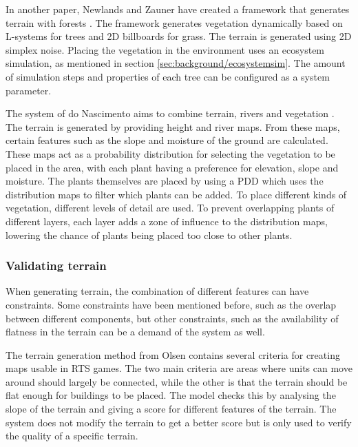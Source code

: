 \documentclass{article}
\begin{document}
In another paper, Newlands and Zauner have created a framework that generates terrain with forests \cite{newlands_procedural_2022}. The framework generates vegetation dynamically based on L-systems for trees and 2D billboards for grass. The terrain is generated using 2D simplex noise. Placing the vegetation in the environment uses an ecosystem simulation, as mentioned in section \ref{sec:background/ecosystemsim}. The amount of simulation steps and properties of each tree can be configured as a system parameter.

The system of do Nascimento aims to combine terrain, rivers and vegetation \cite{do_nascimento_gpu-based_2018}. The terrain is generated by providing height and river maps. From these maps, certain features such as the slope and moisture of the ground are calculated. These maps act as a probability distribution for selecting the vegetation to be placed in the area, with each plant having a preference for elevation, slope and moisture. The plants themselves are placed by using a PDD which uses the distribution maps to filter which plants can be added. To place different kinds of vegetation, different levels of detail are used. To prevent overlapping plants of different layers, each layer adds a zone of influence to the distribution maps, lowering the chance of plants being placed too close to other plants.

\subsubsection{Validating terrain}
When generating terrain, the combination of different features can have constraints. Some constraints have been mentioned before, such as the overlap between different components, but other constraints, such as the availability of flatness in the terrain can be a demand of the system as well.

The terrain generation method from Olsen \cite{olsen_realtime_2004} contains several criteria for creating maps usable in RTS games. The two main criteria are areas where units can move around should largely be connected, while the other is that the terrain should be flat enough for buildings to be placed. The model checks this by analysing the slope of the terrain and giving a score for different features of the terrain. The system does not modify the terrain to get a better score but is only used to verify the quality of a specific terrain.
\end{document}
